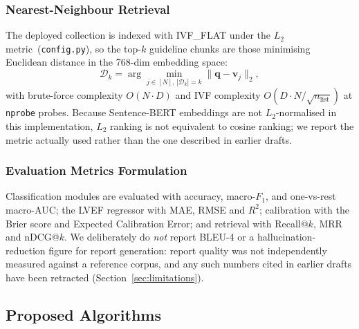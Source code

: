 \documentclass[AMA,STIX1COL,]{WileyNJD-v2}
\begin{document}
\subsubsection{Nearest-Neighbour Retrieval}

The deployed collection is indexed with \textsc{IVF\_FLAT} under the
$L_2$ metric~(\texttt{config.py}), so the top-$k$ guideline chunks are
those minimising Euclidean distance in the 768-dim embedding space:
\begin{equation}
\mathcal{D}_k = \arg\min_{j\in[N],\,|\mathcal{D}_k|=k}
  \|\mathbf{q}-\mathbf{v}_j\|_2,
\label{eq:l2}
\end{equation}
with brute-force complexity $O(N\cdot D)$ and IVF complexity
$O(D\cdot N/\sqrt{n_{\mathrm{list}}})$ at \texttt{nprobe} probes.
Because Sentence-BERT embeddings are not $L_2$-normalised in this
implementation, $L_2$ ranking is not equivalent to cosine ranking; we
report the metric actually used rather than the one described in
earlier drafts.

\subsubsection{Evaluation Metrics Formulation}

Classification modules are evaluated with accuracy, macro-$F_1$, and
one-vs-rest macro-AUC; the LVEF regressor with MAE, RMSE and $R^2$;
calibration with the Brier score and Expected Calibration Error; and
retrieval with Recall@$k$, MRR and nDCG@$k$. We deliberately do
\emph{not} report BLEU-4 or a hallucination-reduction figure for report
generation: report quality was not independently measured against a
reference corpus, and any such numbers cited in earlier drafts have
been retracted (Section~\ref{sec:limitations}).

\subsection{Proposed Algorithms}
\label{sec:algorithms}
\end{document}
